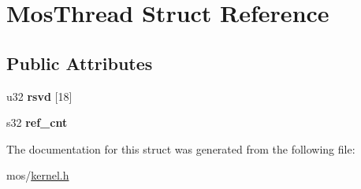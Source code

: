 \hypertarget{structMosThread}{}\section{Mos\+Thread Struct Reference}
\label{structMosThread}
\subsection*{Public Attributes}
\begin{DoxyCompactItemize}
\item 
\mbox{\label{structMosThread_a485202c0d8a788ffaf1c3daf046af79f}} 
u32 {\bfseries rsvd} \mbox{[}18\mbox{]}
\item 
\mbox{\label{structMosThread_acf529fb4d8e9cc2aa7332cbc364e35e0}} 
s32 {\bfseries ref\+\_\+cnt}
\end{DoxyCompactItemize}


The documentation for this struct was generated from the following file\+:\begin{DoxyCompactItemize}
\item 
mos/\hyperlink{kernel_8h}{kernel.\+h}\end{DoxyCompactItemize}
